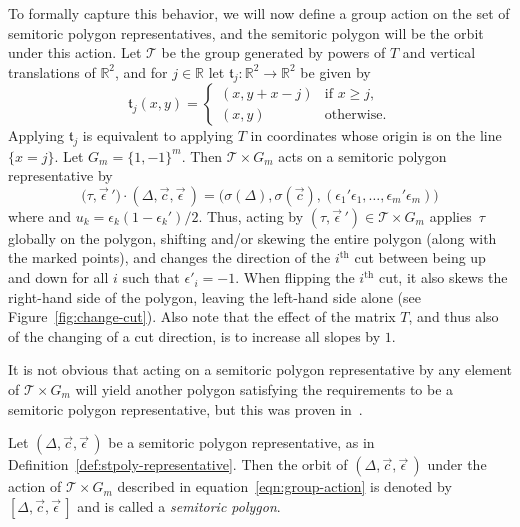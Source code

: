 \documentclass[pdftex]{sigma}
\numberwithin{equation}{section}
\def\R{{\mathbb R}}
\newcommand{\De}{\Delta}
\newcommand{\stpoly}{[\De,\vec{c},\vec{\epsilon}\,]}
\newcommand{\strep}{(\De,\vec{c},\vec{\epsilon}\,)}
\begin{document}
To formally capture this behavior, we will now define a group action on the set of semitoric polygon representatives, and the semitoric polygon will be the orbit under this action.
Let $\mathcal{T}$ be the group generated by powers of $T$ and vertical translations of $\R^2$, and for $j\in\R$ let $\mathfrak{t}_j \colon \R^2\to\R^2$ be given by
\begin{equation}\label{eqn:frakt}
\mathfrak{t}_j(x,y)= \begin{cases}(x, y + x - j) & \textrm{if } x\geq j, \\ (x, y) & \textrm{otherwise.} \end{cases}
\end{equation}
Applying $\mathfrak{t}_j$ is equivalent to applying $T$ in coordinates whose origin is on the line $\{x=j\}$.
Let $G_m = \{1, -1\}^m$.
Then $\mathcal{T}\times G_m$ acts on a semitoric polygon representative by
\begin{equation}\label{eqn:group-action}
 \big(\tau,\vec{\epsilon}\,{}'\big)\cdot \strep = \big(\sigma(\De), \sigma(\vec{c}), (\epsilon_1' \epsilon_1,\ldots, \epsilon_m' \epsilon_m)\big)
\end{equation}
where  and
$u_k = \epsilon_k (1-\epsilon_k')/2$.
Thus, acting by $(\tau,\vec{\epsilon}\,{}')\in \mathcal{T}\times G_m$ applies~$\tau$ globally on the polygon, shifting and/or skewing the entire polygon (along with the marked points), and changes the direction of the $i^{\mathrm{th}}$ cut between being up and down for all $i$ such that $\epsilon'_i = -1$.
When flipping the $i^{\mathrm{th}}$ cut, it also skews the right-hand side of the polygon, leaving the left-hand side alone (see Figure~\ref{fig:change-cut}).
Also note that the effect of the matrix $T$, and thus also of the changing of a cut direction, is to increase all slopes by $1$.

It is not obvious that acting on a semitoric polygon representative by any element of $\mathcal{T}\times G_m$ will yield another polygon satisfying the requirements to be a semitoric polygon representative, but this was proven in~\cite[Lemma 4.2]{PeVN2011}.

\begin{Definition}\label{def:semitoric-polygon}
Let $\strep$ be a semitoric polygon representative, as in Definition~\ref{def:stpoly-representative}. Then the orbit of $\strep$ under the action of $\mathcal{T}\times G_m$ described in equation~\eqref{eqn:group-action} is denoted by~$\stpoly$ and is called a \emph{semitoric polygon}.
\end{Definition}
\end{document}

